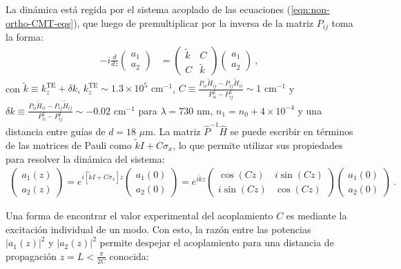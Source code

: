 La dinámica está regida por el sistema acoplado de las ecuaciones (\ref{eqn:non-ortho-CMT-eqs}), que luego de premultiplicar por la inversa de la matriz $P_{ij}$ toma la forma:
\begin{align*}
	-i\frac{d}{dz}\begin{pmatrix}
	a_1
	\\
	a_2
	\end{pmatrix} &= 	
	\begin{pmatrix}
	\tilde{k} & C
	\\
	C & \tilde{k}
	\end{pmatrix}
	\begin{pmatrix}
	a_1
	\\
	a_2
	\end{pmatrix} \ ,
\end{align*}
con $\tilde{k}\equiv k_z^{\text{TE}} + \delta k$, $k_z^{\text{TE}} \sim 1.3\times10^5 \text{ cm}^{-1}$, $C\equiv \frac{P_{ii} \tilde{H}_{ij}  -P_{ij}\tilde{H}_{ii}}{P_{ii}^2-P_{ij}^2} \sim 1\text{ cm}^{-1}$ y $\delta k \equiv \frac{P_{ii} \tilde{H}_{ii} -P_{ij}\tilde{H}_{ij}}{P_{ii}^2-P_{ij}^2} \sim -0.02\text{ cm}^{-1}$ para $\lambda = 730$ nm, $n_1 = n_0 + 4\times10^{-4}$ y una distancia entre guías de $d = 18 $ $\mu$m. La matriz $\hat{P}^{-1}\hat{H}$ se puede escribir en términos de las matrices de Pauli como $\tilde{k}I + C\sigma_x $, lo que permite utilizar sus propiedades para resolver la dinámica del sistema:
\begin{align*}
	\begin{pmatrix}
	a_1(z)
	\\
	a_2(z)
	\end{pmatrix}
	=
	e^{{i\left[\tilde{k}I + C\sigma_x\right]z }}	\begin{pmatrix}
	a_1(0)
	\\
	a_2(0)
	\end{pmatrix}
	=
	e^{i\tilde{k}z}
	\begin{pmatrix}
	\cos(Cz) & i\sin(Cz)
	\\
	i\sin(Cz) & \cos(Cz)
	\end{pmatrix}
	\begin{pmatrix}
	a_1(0)
	\\
	a_2(0)
	\end{pmatrix} \ .
\end{align*}

Una forma de encontrar el valor experimental del acoplamiento $C$ es mediante la excitación individual de un modo. Con esto, la razón entre las potencias $|a_1(z)|^2$ y $|a_2(z)|^2$ permite despejar el acoplamiento para una distancia de propagación $z=L<\frac{\pi}{2C}$ conocida:

